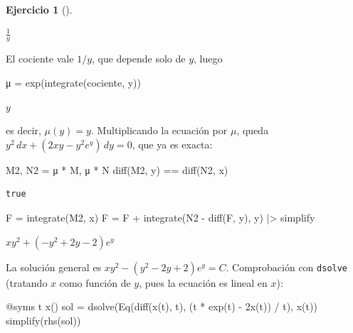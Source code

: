 \documentclass[
  spanish,
  a4paper,
]{scrreport}
\newenvironment{Shaded}{\begin{snugshade}}{\end{snugshade}}
\newcommand{\FloatTok}[1]{\textcolor[rgb]{0.68,0.00,0.00}{#1}}
\newcommand{\FunctionTok}[1]{\textcolor[rgb]{0.28,0.35,0.67}{#1}}
\newcommand{\NormalTok}[1]{\textcolor[rgb]{0.00,0.23,0.31}{#1}}
\newcommand{\OperatorTok}[1]{\textcolor[rgb]{0.37,0.37,0.37}{#1}}
\newcommand{\PreprocessorTok}[1]{\textcolor[rgb]{0.68,0.00,0.00}{#1}}
\theoremstyle{definition}
\newtheorem{exercise}{Ejercicio}[chapter]
\theoremstyle{remark}
\begin{document}
\begin{exercise}[]
\begin{tcolorbox}
$\frac{1}{y}$

El cociente vale \(1/y\), que depende solo de \(y\), luego

\begin{Shaded}
\begin{Highlighting}[]
\NormalTok{μ }\OperatorTok{=} \FunctionTok{exp}\NormalTok{(}\FunctionTok{integrate}\NormalTok{(cociente, y))}
\end{Highlighting}
\end{Shaded}

$y$

es decir, \(\mu(y)=y\). Multiplicando la ecuación por \(\mu\), queda
\(y^2\,dx + (2xy - y^2 e^y)\,dy = 0\), que ya es exacta:

\begin{Shaded}
\begin{Highlighting}[]
\NormalTok{M2, N2 }\OperatorTok{=}\NormalTok{ μ }\OperatorTok{*}\NormalTok{ M, μ }\OperatorTok{*}\NormalTok{ N}
\FunctionTok{diff}\NormalTok{(M2, y) }\OperatorTok{==} \FunctionTok{diff}\NormalTok{(N2, x)}
\end{Highlighting}
\end{Shaded}

\begin{verbatim}
true
\end{verbatim}

\begin{Shaded}
\begin{Highlighting}[]
\NormalTok{F }\OperatorTok{=} \FunctionTok{integrate}\NormalTok{(M2, x)}
\NormalTok{F }\OperatorTok{=}\NormalTok{ F }\OperatorTok{+} \FunctionTok{integrate}\NormalTok{(N2 }\OperatorTok{{-}} \FunctionTok{diff}\NormalTok{(F, y), y) }\OperatorTok{|\textgreater{}}\NormalTok{ simplify}
\end{Highlighting}
\end{Shaded}

$x y^{2} + \left(- y^{2} + 2 y - 2\right) e^{y}$

La solución general es \(x y^2 - (y^2 - 2y + 2)e^y = C\). Comprobación
con \texttt{dsolve} (tratando \(x\) como función de \(y\), pues la
ecuación es lineal en \(x\)):

\begin{Shaded}
\begin{Highlighting}[]
\PreprocessorTok{@syms}\NormalTok{ t }\FunctionTok{x}\NormalTok{()}
\NormalTok{sol }\OperatorTok{=} \FunctionTok{dsolve}\NormalTok{(}\FunctionTok{Eq}\NormalTok{(}\FunctionTok{diff}\NormalTok{(}\FunctionTok{x}\NormalTok{(t), t), (t }\OperatorTok{*} \FunctionTok{exp}\NormalTok{(t) }\OperatorTok{{-}} \FloatTok{2}\FunctionTok{x}\NormalTok{(t)) }\OperatorTok{/}\NormalTok{ t), }\FunctionTok{x}\NormalTok{(t))}
\FunctionTok{simplify}\NormalTok{(}\FunctionTok{rhs}\NormalTok{(sol))}
\end{Highlighting}
\end{Shaded}


\end{tcolorbox}
\end{exercise}
\end{document}
